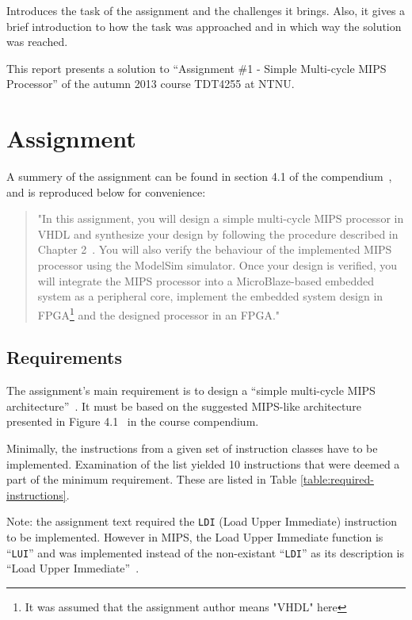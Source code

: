 Introduces the task of the assignment and the challenges it
brings.
Also, it gives a brief introduction to how the task was approached and in which way the solution was reached.


This report presents a solution to ``Assignment \#1 - Simple Multi-cycle MIPS Processor'' of the autumn 2013 course TDT4255 at NTNU.

\section{Assignment}

A summery of the assignment can be found in section 4.1 of the compendium~\cite[p.114]{compendium}, and is reproduced below for convenience:

\begin{quote}
"In this assignment, you will design a simple multi-cycle MIPS processor in VHDL and synthesize your design by following the procedure described in Chapter 2~\cite[of the compendium]{compendium}.
You will also verify the behaviour of the implemented MIPS processor using the ModelSim simulator.
Once your design is verified, you will integrate the MIPS processor into a MicroBlaze-based embedded system as a peripheral core, implement the embedded system design in FPGA\footnote{It was assumed that the assignment author means "VHDL" here} and the designed processor in an FPGA."
\end{quote}

\subsection{Requirements}

The assignment's main requirement is to design a ``simple multi-cycle MIPS architecture''~\cite[p.114]{compendium}. It must be based on the suggested MIPS-like architecture presented in Figure 4.1~\cite[p.115]{compendium} in the course compendium.

Minimally, the instructions from a given set of instruction classes have to be implemented. 
Examination of the list yielded 10 instructions that were deemed a part of the minimum requirement.
These are listed in Table \ref{table:required-instructions}.

Note: the assignment text required the \texttt{LDI} (Load Upper Immediate) instruction to be implemented. However in MIPS, the Load Upper Immediate function is ``\texttt{LUI}'' and was implemented instead of the non-existant ``\texttt{LDI}'' as its description is ``Load Upper Immediate''~\cite[p.129]{mips32-instruction-set}.


